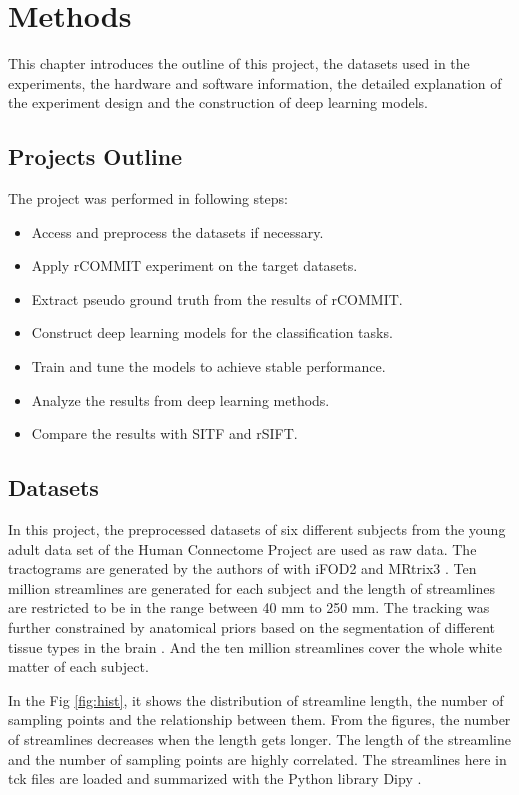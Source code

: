 \chapter{Methods}

This chapter introduces the outline of this project, the datasets used in the experiments, the hardware and software information, the detailed 
explanation of the experiment design and the construction of deep learning models.

\section{Projects Outline}
The project was performed in following steps:
\begin{itemize}
    \item Access and preprocess the datasets if necessary.
    \item Apply rCOMMIT experiment on the target datasets.
    \item Extract pseudo ground truth from the results of rCOMMIT.
    \item Construct deep learning models for the classification tasks.
    \item Train and tune the models to achieve stable performance.
    \item Analyze the results from deep learning methods.
    \item Compare the results with SITF and rSIFT.
  \end{itemize}

\section{Datasets}
In this project, the preprocessed datasets of six different subjects from the young adult data set of the Human Connectome Project \cite{vanessenWUMinnHumanConnectome2013} are used as raw data.
The tractograms are generated by the authors of \cite{TractSegFastAccurate} with iFOD2 \cite{tournierImprovedProbabilisticStreamlinesa} and MRtrix3 \cite{tournierMRtrix3FastFlexible2019}. 
Ten million streamlines are generated for each subject and the length of streamlines are restricted to be in the range between 40 mm to 250 mm.
The tracking was further constrained by anatomical priors based on the segmentation of different tissue types in the brain \cite{smithAnatomicallyconstrainedTractographyImproved2012}.
And the ten million streamlines cover the whole white matter of each subject. 

In the Fig \ref{fig:hist}, it shows the distribution of streamline length, the number of sampling points and the relationship between them.
From the figures, the number of streamlines decreases when the length gets longer. The length of the streamline and the number of sampling points 
are highly correlated. The streamlines here in tck files are loaded and summarized with the Python library Dipy \cite{garyfallidisDipyLibraryAnalysis2014}.

